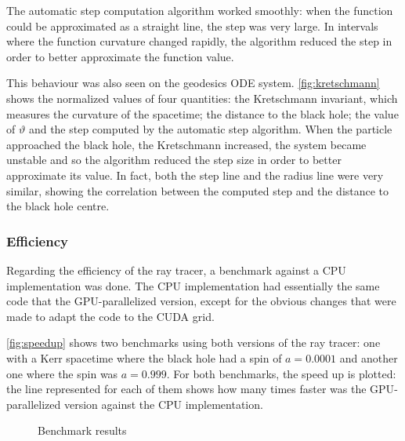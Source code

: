 The automatic step computation algorithm worked smoothly: when the function could be approximated as a straight line, the step was very large. In intervals where the function curvature changed rapidly, the algorithm reduced the step in order to better approximate the function value.

This behaviour was also seen on the geodesics \ac{ODE} system. \autoref{fig:kretschmann} shows the normalized values of four quantities: the Kretschmann invariant, which measures the curvature of the spacetime; the distance to the black hole; the value of $\vartheta$ and the step computed by the automatic step algorithm. When the particle approached the black hole, the Kretschmann increased, the system became unstable and so the algorithm reduced the step size in order to better approximate its value. In fact, both the step line and the radius line were very similar, showing the correlation between the computed step and the distance to the black hole centre.

\subsubsection*{Efficiency}

Regarding the efficiency of the ray tracer, a benchmark against a \ac{CPU} implementation was done. The \ac{CPU} implementation had essentially the same code that the \ac{GPU}-parallelized version, except for the obvious changes that were made to adapt the code to the \ac{CUDA} grid.

\autoref{fig:speedup} shows two benchmarks using both versions of the ray tracer: one with a Kerr spacetime where the black hole had a spin of $a = 0.0001$ and another one where the spin was $a = 0.999$. For both benchmarks, the speed up is plotted: the line represented for each of them shows how many times faster was the \ac{GPU}-parallelized version against the \ac{CPU} implementation.

\begin{figure}[bth]
	\myfloatalign
	 \quad
	\caption[Benchmark results]{Benchmark results}\label{fig:benchmark}
\end{figure}


